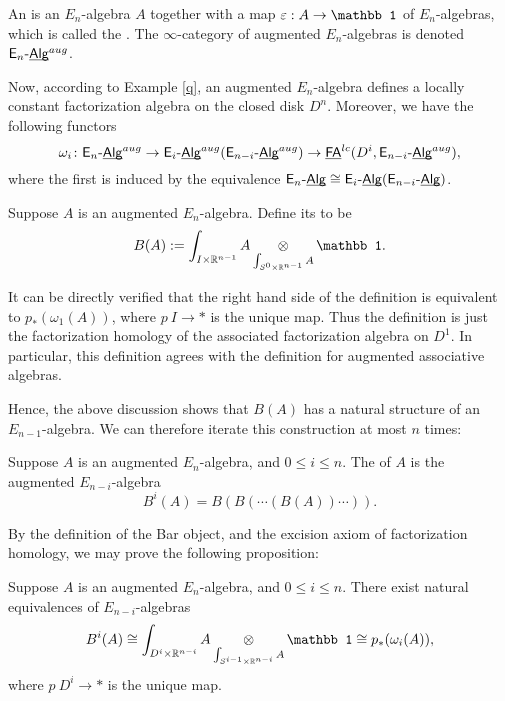 \documentclass[twoside]{article}
\begin{document}
\begin{definition}
    An  is an $E_n$-algebra $A$ together with a map
    $\ve:A\to\mathbb1$ of $E_n$-algebras, which is called the .
    The $\infty$-category of augmented $E_n$-algebras is denoted $\mathsf{E}_n\text{-}\underline{\smash{\mathsf{Alg}}}^{aug}$.
\end{definition}

Now, according to Example \ref{q}, an augmented $E_n$-algebra defines a locally
constant factorization algebra on the closed disk $D^n$. Moreover, we have the
following functors $$\omega_i\colon\mathsf{E}_n\text{-}\underline{\smash{\mathsf{Alg}}}^{aug}\to\mathsf{E}_i\text{-}\underline{\smash{\mathsf{Alg}}}^{aug}
(\mathsf{E}_{n-i}\text{-}\underline{\smash{\mathsf{Alg}}}^{aug})\to\underline{\smash{\mathsf{FA}}}^{lc}(D^i,\mathsf{E}_{n-i}\text{-}\underline{\smash{\mathsf{Alg}}}^{aug}),$$ where the first
is induced by the equivalence $\mathsf{E}_n\text{-}\underline{\smash{\mathsf{Alg}}}\cong\mathsf{E}_i\text{-}\underline{\smash{\mathsf{Alg}}}(\mathsf{E}_{n-i}\text{-}\underline{\smash{\mathsf{Alg}}})$.

\begin{definition}
    Suppose $A$ is an augmented $E_n$-algebra. Define its 
    to be $$B(A):=\int_{I\times\R^{n-1}}A\mathop{\operatorname{\ox}}\limits_
    {\int_{S^0\times\R^{n-1}}A}\mathbb1.$$
\end{definition}

It can be directly verified that the right hand side of the definition
is equivalent to $p_*(\omega_1(A))$, where $p\:I\to *$ is the unique map.
Thus the definition is just the factorization homology of the associated
factorization algebra on $D^1$. In particular, this definition agrees with
the definition for augmented associative algebras.

Hence, the above discussion shows that $B(A)$ has a natural structure of an
$E_{n-1}$-algebra. We can therefore iterate this construction at most $n$ times:

\begin{definition}
    Suppose $A$ is an augmented $E_n$-algebra, and $0\le i\le n$. The  of $A$ is the augmented $E_{n-i}$-algebra $$B^i(A)
    =B(B(\cdots(B(A))\cdots)).$$
\end{definition}

By the definition of the Bar object, and the excision axiom of factorization
homology, we may prove the following proposition:

\begin{proposition}
    Suppose $A$ is an augmented $E_n$-algebra, and $0\le i\le n$. There exist
    natural equivalences of $E_{n-i}$-algebras $$B^i(A)\cong
    \int_{D^i\times\R^{n-i}}A\mathop{\operatorname{\ox}}\limits_
    {\int_{S^{i-1}\times\R^{n-i}}A}\mathbb1\cong p_*(\omega_i(A)),$$
    where $p\:D^i\to *$ is the unique map. 
\end{proposition}
\end{document}
